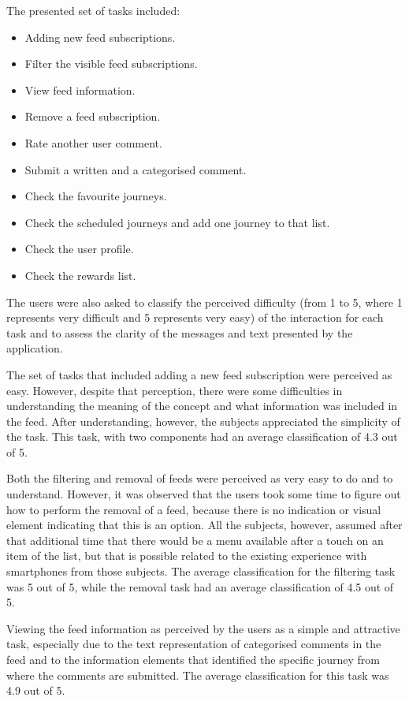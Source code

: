 The presented set of tasks included: 

\begin{itemize}
\item Adding new feed subscriptions.
\item Filter the visible feed subscriptions.
\item View feed information.
\item Remove a feed subscription.
\item Rate another user comment.
\item Submit a written and a categorised comment.
\item Check the favourite journeys.
\item Check the scheduled journeys and add one journey to that list.
\item Check the user profile.
\item Check the rewards list.
\end{itemize}

The users were also asked to classify the perceived difficulty (from 1 to 5, where 1 represents very difficult and 5 represents very easy) of the interaction for each task and to assess the clarity of the messages and text presented by the application.

The set of tasks that included adding a new feed subscription were perceived as easy. However, despite that perception, there were some difficulties in understanding the meaning of the concept and what information was included in the feed. After understanding, however, the subjects appreciated the simplicity of the task. This task, with two components had an average classification of 4.3 out of 5.

Both the filtering and removal of feeds were perceived as very easy to do and to understand. However, it was observed that the users took some time to figure out how to perform the removal of a feed, because there is no indication or visual element indicating that this is an option. All the subjects, however, assumed after that additional time that there would be a menu available after a touch on an item of the list, but that is possible related to the existing experience with smartphones from those subjects. The average classification for the filtering task was 5 out of 5, while the removal task had an average classification of 4.5 out of 5.

Viewing the feed information as perceived by the users as a simple and attractive task, especially due to the text representation of categorised comments in the feed and to the information elements that identified the specific journey from where the comments are submitted. The average classification for this task was 4.9 out of 5.

